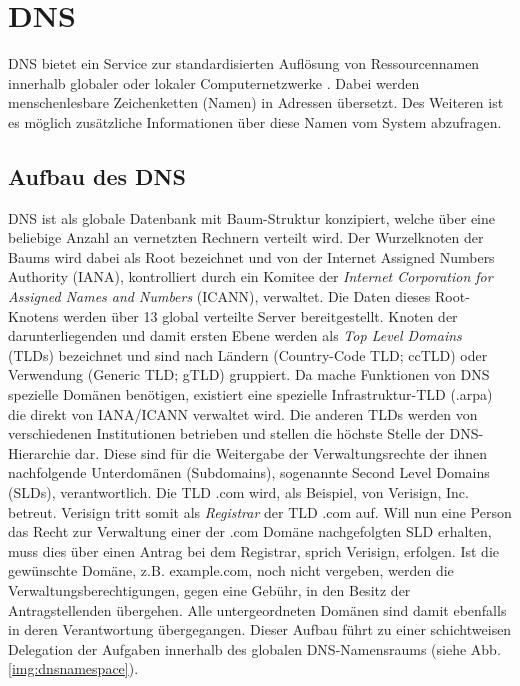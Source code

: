 \chapter{DNS}
\label{chap:dns}

DNS bietet ein Service zur standardisierten Auflösung von Ressourcennamen innerhalb globaler oder lokaler Computernetzwerke \cite{rfc1035}. Dabei werden menschenlesbare Zeichenketten (Namen) in Adressen übersetzt. Des Weiteren ist es möglich zusätzliche Informationen über diese Namen vom System abzufragen.

\section{Aufbau des DNS}

DNS ist als globale Datenbank mit Baum-Struktur konzipiert, welche über eine beliebige Anzahl an vernetzten Rechnern verteilt wird. Der Wurzelknoten der Baums wird dabei als Root bezeichnet und von der Internet Assigned Numbers Authority (IANA), kontrolliert durch ein Komitee der \textit{Internet Corporation for Assigned Names and Numbers} (ICANN), verwaltet. Die Daten dieses Root-Knotens werden über 13 global verteilte Server bereitgestellt. 
Knoten der darunterliegenden und damit ersten Ebene werden als \textit{Top Level Domains} (TLDs) bezeichnet und sind nach Ländern (Country-Code TLD; ccTLD) oder Verwendung (Generic TLD; gTLD) gruppiert. Da mache Funktionen von DNS spezielle Domänen benötigen, existiert eine spezielle Infrastruktur-TLD (.arpa) die direkt von IANA/ICANN verwaltet wird. Die anderen TLDs werden von verschiedenen Institutionen betrieben und stellen die höchste Stelle der DNS-Hierarchie dar. Diese sind für die Weitergabe der Verwaltungsrechte der ihnen nachfolgende Unterdomänen (Subdomains), sogenannte Second Level Domains (SLDs), verantwortlich. Die TLD .com wird, als Beispiel, von Verisign, Inc. betreut. Verisign tritt somit als \textit{Registrar} der TLD .com auf. Will nun eine Person das Recht zur Verwaltung einer der .com Domäne nachgefolgten SLD erhalten, muss dies über einen Antrag bei dem Registrar, sprich Verisign, erfolgen. Ist die gewünschte Domäne, z.B. example.com, noch nicht vergeben, werden die Verwaltungsberechtigungen, gegen eine Gebühr, in den Besitz der Antragstellenden übergehen. Alle untergeordneten Domänen sind damit ebenfalls in deren Verantwortung übergegangen. Dieser Aufbau führt zu einer schichtweisen Delegation der Aufgaben innerhalb des globalen DNS-Namensraums (siehe Abb. \ref{img:dnsnamespace}). 

